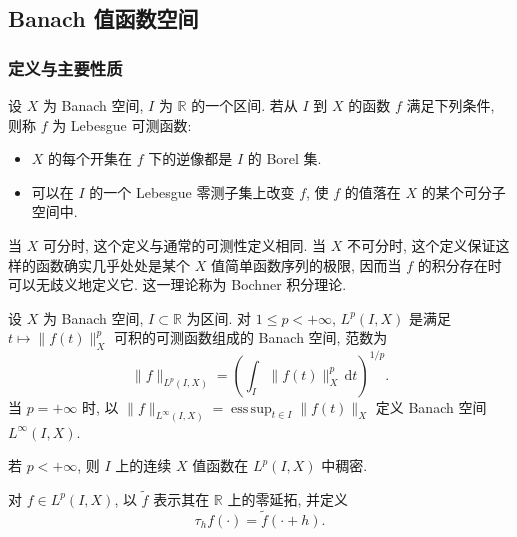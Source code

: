 \subsection{Banach 值函数空间}
\label{sec:chap2-banach-valued-functions}
\renewcommand{\thestatement}{5.\number\numexpr\value{statement}-70\relax}
\renewcommand{\thechapterfiveremark}{5.\arabic{chapterfiveremark}}

\subsubsection{定义与主要性质}
\label{subsec:chap2-bochner-spaces}

\begin{Definition}
\label{def:chap2-banach-valued-measurable}
设 $X$ 为 Banach 空间, $I$ 为 $\mathbb{R}$ 的一个区间. 若从 $I$ 到 $X$ 的函数 $f$ 满足下列条件, 则称 $f$ 为 Lebesgue 可测函数:
\begin{itemize}
 \item $X$ 的每个开集在 $f$ 下的逆像都是 $I$ 的 Borel 集.
 \item 可以在 $I$ 的一个 Lebesgue 零测子集上改变 $f$, 使 $f$ 的值落在 $X$ 的某个可分子空间中.
\end{itemize}
\end{Definition}

当 $X$ 可分时, 这个定义与通常的可测性定义相同. 当 $X$ 不可分时, 这个定义保证这样的函数确实几乎处处是某个 $X$ 值简单函数序列的极限, 因而当 $f$ 的积分存在时可以无歧义地定义它. 这一理论称为 Bochner 积分理论.

\begin{Proposition}
\label{prop:chap2-bochner-lp-banach}
设 $X$ 为 Banach 空间, $I\subset\mathbb{R}$ 为区间. 对 $1\leq p<+\infty$, $L^p(I,X)$ 是满足 $t\mapsto\|f(t)\|_X^p$ 可积的可测函数组成的 Banach 空间, 范数为
\[
 \|f\|_{L^p(I,X)}=\left(\int_I\|f(t)\|_X^p\,\mathrm{d}t\right)^{1/p}.
\]
当 $p=+\infty$ 时, 以 $\|f\|_{L^\infty(I,X)}=\operatorname*{ess\,sup}_{t\in I}\|f(t)\|_X$ 定义 Banach 空间 $L^\infty(I,X)$.
\end{Proposition}

\begin{Proposition}
\label{prop:chap2-continuous-dense-bochner-lp}
若 $p<+\infty$, 则 $I$ 上的连续 $X$ 值函数在 $L^p(I,X)$ 中稠密.
\end{Proposition}

对 $f\in L^p(I,X)$, 以 $\widetilde f$ 表示其在 $\mathbb{R}$ 上的零延拓, 并定义
\begin{equation}
 \tau_hf(\cdot)=\widetilde f(\cdot+h).
 \label{eq:chap2-banach-translation}
\end{equation}

